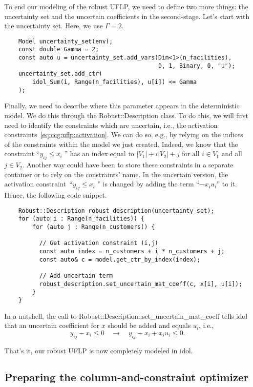 To end our modeling of the robust UFLP, we need to define two more things: the
uncertainty set and the uncertain coefficients in the second-stage. Let's
start with the uncertainty set. Here, we use $\Gamma = 2$.
%
\begin{lstlisting}
    Model uncertainty_set(env);
    const double Gamma = 2;
    const auto u = uncertainty_set.add_vars(Dim<1>(n_facilities), 
                                            0, 1, Binary, 0, "u");
    uncertainty_set.add_ctr(
        idol_Sum(i, Range(n_facilities), u[i]) <= Gamma
    );
\end{lstlisting}
Finally, we need to describe where this parameter appears in the deterministic
model. We do this through the \textsf{Robust::Description} class. To do this,
we will first need to identify the constraints which are uncertain, i.e., the
activation constraints~\eqref{eq:ccg:uflp:activation}. We can do so, e.g., by
relying on the indices of the constraints within the model we just created.
Indeed, we know that the constraint ``$y_{ij} \le x_i$ '' has an index equal
to $|V_1| + i|V_2| + j$ for all $i\in V_1$ and all $j\in V_2$. Another way
could have been to store these constraints in a separate container or to rely
on the constraints' name. In the uncertain version, the activation
constraint~``$y_{ij} \le x_i$ '' is changed by adding the term ``$- x_i u_i$''
to it. Hence, the following code snippet.
%
\begin{lstlisting}
    Robust::Description robust_description(uncertainty_set);
    for (auto i : Range(n_facilities)) {
        for (auto j : Range(n_customers)) {
            
          // Get activation constraint (i,j)
          const auto index = n_customers + i * n_customers + j;
          const auto& c = model.get_ctr_by_index(index);

          // Add uncertain term
          robust_description.set_uncertain_mat_coeff(c, x[i], u[i]);
        }
    }
\end{lstlisting}
In a nutshell, the call to
\textsf{Robust::Description::set\_uncertain\_mat\_coeff} tells idol that an
uncertain coefficient for $x$ should be added and equals $u_i$, i.e., 
\begin{equation*}
    y_{ij} - x_i \le 0 \quad \longrightarrow \quad y_{ij} - x_i + x_iu_i \le 0.
\end{equation*}

That's it, our robust UFLP is now completely modeled in \textsf{idol}.

\subsection{Preparing the column-and-constraint optimizer}

